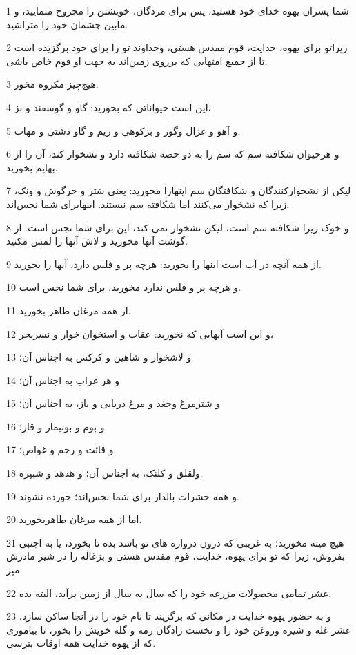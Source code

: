 \par 1 شما پسران یهوه خدای خود هستید، پس برای مردگان، خویشتن را مجروح منمایید، و مابین چشمان خود را متراشید.
\par 2 زیراتو برای یهوه، خدایت، قوم مقدس هستی، وخداوند تو را برای خود برگزیده است تا از جمیع امتهایی که برروی زمین‌اند به جهت او قوم خاص باشی.
\par 3 هیچ‌چیز مکروه مخور.
\par 4 این است حیواناتی که بخورید: گاو و گوسفند و بز،
\par 5 و آهو و غزال وگور و بزکوهی و ریم و گاو دشتی و مهات.
\par 6 و هرحیوان شکافته سم که سم را به دو حصه شکافته دارد و نشخوار کند، آن را از بهایم بخورید.
\par 7 لیکن از نشخوارکنندگان و شکافتگان سم اینهارا مخورید: یعنی شتر و خرگوش و ونک، زیرا که نشخوار می‌کنند اما شکافته سم نیستند. اینهابرای شما نجس‌اند.
\par 8 و خوک زیرا شکافته سم است، لیکن نشخوار نمی کند، این برای شما نجس است. از گوشت آنها مخورید و لاش آنها را لمس مکنید.
\par 9 از همه آنچه در آب است اینها را بخورید: هرچه پر و فلس دارد، آنها را بخورید.
\par 10 و هرچه پر و فلس ندارد مخورید، برای شما نجس است.
\par 11 از همه مرغان طاهر بخورید.
\par 12 و این است آنهایی که نخورید: عقاب و استخوان خوار و نسربحر،
\par 13 و لاشخوار و شاهین و کرکس به اجناس آن؛
\par 14 و هر غراب به اجناس آن؛
\par 15 و شترمرغ وجغد و مرغ دریایی و باز، به اجناس آن؛
\par 16 و بوم و بوتیمار و قاز؛
\par 17 و قائت و رخم و غواص؛
\par 18 ولقلق و کلنک، به اجناس آن؛ و هدهد و شبپره.
\par 19 و همه حشرات بالدار برای شما نجس‌اند؛ خورده نشوند.
\par 20 اما از همه مرغان طاهربخورید.
\par 21 هیچ میته مخورید؛ به غریبی که درون دروازه های تو باشد بده تا بخورد، یا به اجنبی بفروش، زیرا که تو برای یهوه، خدایت، قوم مقدس هستی و بزغاله را در شیر مادرش مپز.
\par 22 عشر تمامی محصولات مزرعه خود را که سال به سال از زمین برآید، البته بده.
\par 23 و به حضور یهوه خدایت در مکانی که برگزیند تا نام خود را در آنجا ساکن سازد، عشر غله و شیره وروغن خود را و نخست زادگان رمه و گله خویش را بخور، تا بیاموزی که از یهوه خدایت همه اوقات بترسی.
